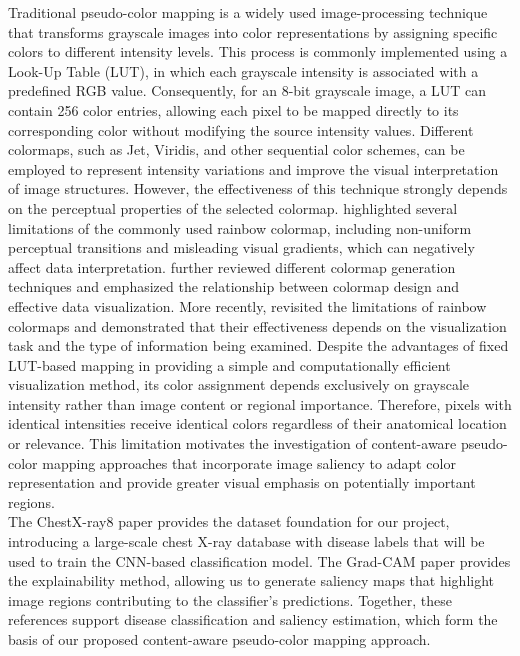 \documentclass[11pt]{article}
\begin{document}
Traditional pseudo-color mapping is a widely used image-processing
technique that transforms grayscale images into color representations
by assigning specific colors to different intensity levels. This
process is commonly implemented using a Look-Up Table (LUT), in which
each grayscale intensity is associated with a predefined RGB value.
Consequently, for an 8-bit grayscale image, a LUT can contain 256 color
entries, allowing each pixel to be mapped directly to its corresponding
color without modifying the source intensity values. Different
colormaps, such as Jet, Viridis, and other sequential color schemes,
can be employed to represent intensity variations and improve the
visual interpretation of image structures. However, the effectiveness
of this technique strongly depends on the perceptual properties of
the selected colormap.
\citet{borland2007rainbow} highlighted several limitations of the commonly
used rainbow colormap, including non-uniform perceptual transitions
and misleading visual gradients, which can negatively affect data
interpretation. \citet{zhou2016survey} further reviewed
different colormap generation techniques and emphasized the relationship
between colormap design and effective data visualization. More recently,
\citet{ware2023rainbow} revisited the limitations of rainbow colormaps
and demonstrated that their effectiveness depends on the visualization
task and the type of information being examined. Despite the advantages
of fixed LUT-based mapping in providing a simple and computationally
efficient visualization method, its color assignment depends exclusively
on grayscale intensity rather than image content or regional importance.
Therefore, pixels with identical intensities receive identical colors
regardless of their anatomical location or relevance. This limitation
motivates the investigation of content-aware pseudo-color mapping
approaches that incorporate image saliency to adapt color representation
and provide greater visual emphasis on potentially important regions.\\

The ChestX-ray8 paper \cite{Wang2017ChestXRay8} provides the dataset foundation for our project, introducing a large-scale chest X-ray database with disease labels that will be used to train the CNN-based classification model. The Grad-CAM paper \cite{Selvaraju2020GradCAM} provides the explainability method, allowing us to generate saliency maps that highlight image regions contributing to the classifier's predictions. Together, these references support disease classification and saliency estimation, which form the basis of our proposed content-aware pseudo-color mapping approach.\\
\end{document}

